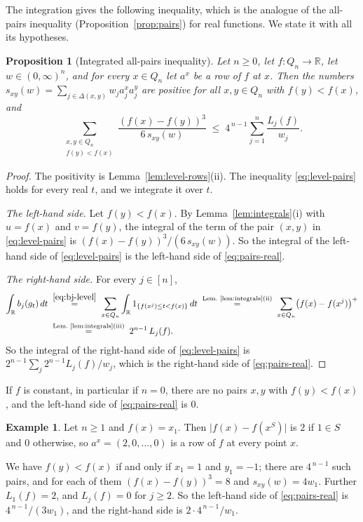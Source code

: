 \documentclass[11pt,reqno]{amsart}
\newtheorem{proposition}[theorem]{Proposition}
\theoremstyle{definition}
\newtheorem{example}[theorem]{Example}
\theoremstyle{remark}
\numberwithin{equation}{section}
\theoremstyle{named}
\theoremstyle{plain}
\newcommand{\R}{\mathbb{R}}
\newcommand{\abs}[1]{\lvert #1\rvert}
\begin{document}
The integration gives the following inequality, which is the analogue of the all-pairs inequality (Proposition~\ref{prop:pairs})
for real functions. We state it with all its hypotheses.

\begin{proposition}[Integrated all-pairs inequality]\label{prop:pairs-real}
Let $n\ge0$, let $f\colon Q_n\to\R$, let $w\in(0,\infty)^{n}$, and for every $x\in Q_n$ let $a^{x}$
be a row of $f$ at $x$. Then the numbers
$s_{xy}(w)=\sum_{j\in\Delta(x,y)}w_ja^{x}_ja^{y}_j$ are positive for all $x,y\in Q_n$ with
$f(y)<f(x)$, and
\begin{equation}\label{eq:pairs-real}
   \sum_{\substack{x,y\in Q_n\\ f(y)<f(x)}}\frac{(f(x)-f(y))^{3}}{6\,s_{xy}(w)}
   \;\le\;4^{\,n-1}\sum_{j=1}^{n}\frac{L_j(f)}{w_j}.
\end{equation}
\end{proposition}

\begin{proof}
The positivity is Lemma~\ref{lem:level-rows}(ii). The inequality \eqref{eq:level-pairs} holds for
every real $t$, and we integrate it over $t$.

\smallskip
\emph{The left-hand side.} Let $f(y)<f(x)$. By Lemma~\ref{lem:integrals}(i) with $u=f(x)$ and
$v=f(y)$, the integral of the term of the pair $(x,y)$ in \eqref{eq:level-pairs} is
$(f(x)-f(y))^{3}/(6\,s_{xy}(w))$. So the integral of the left-hand side of \eqref{eq:level-pairs}
is the left-hand side of \eqref{eq:pairs-real}.

\smallskip
\emph{The right-hand side.} For every $j\in[n]$,
\begin{align*}
   \int_{\R}b_j(g_t)\,dt
   &\;\overset{\eqref{eq:bj-level}}{=}\;\sum_{x\in Q_n}\int_{\R}1_{\{f(x^{j})\le t<f(x)\}}\,dt
   \;\overset{\text{Lem.~\ref{lem:integrals}(ii)}}{=}\;\sum_{x\in Q_n}\bigl(f(x)-f(x^{j})\bigr)^{+}\\
   &\;\overset{\text{Lem.~\ref{lem:integrals}(iii)}}{=}\;2^{n-1}\,L_j(f).
\end{align*}
So the integral of the right-hand side of \eqref{eq:level-pairs} is
$2^{n-1}\sum_j2^{n-1}L_j(f)/w_j$, which is the right-hand side of \eqref{eq:pairs-real}.
\end{proof}

If $f$ is constant, in particular if $n=0$, there are no pairs $x,y$ with $f(y)<f(x)$, and the
left-hand side of \eqref{eq:pairs-real} is $0$.

\begin{example}\label{ex:pairs-real}
Let $n\ge1$ and $f(x)=x_1$. Then $\abs{f(x)-f(x^{S})}$ is $2$ if $1\in S$ and $0$ otherwise, so
$a^{x}=(2,0,\dots,0)$ is a row of $f$ at every point $x$.

We have $f(y)<f(x)$ if and only if
$x_1=1$ and $y_1=-1$; there are $4^{\,n-1}$ such pairs, and for each of them
$(f(x)-f(y))^{3}=8$ and $s_{xy}(w)=4w_1$. Further $L_1(f)=2$, and $L_j(f)=0$ for $j\ge2$. So the
left-hand side of \eqref{eq:pairs-real} is $4^{\,n-1}/(3w_1)$, and the right-hand side is
$2\cdot4^{\,n-1}/w_1$.
\end{example}
\end{document}
